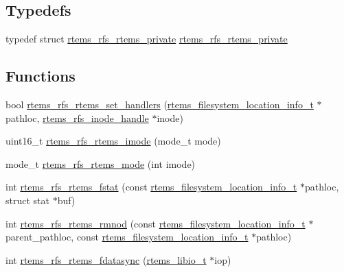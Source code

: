 \subsection*{Typedefs}
\begin{DoxyCompactItemize}
\item 
typedef struct \mbox{\hyperlink{structrtems__rfs__rtems__private}{rtems\+\_\+rfs\+\_\+rtems\+\_\+private}} \mbox{\hyperlink{rtems-rfs-rtems_8h_aceaad4b4b8bccb8901ad1562f83835c8}{rtems\+\_\+rfs\+\_\+rtems\+\_\+private}}
\end{DoxyCompactItemize}
\subsection*{Functions}
\begin{DoxyCompactItemize}
\item 
bool \mbox{\hyperlink{rtems-rfs-rtems_8h_a476a19330258f7b28ef99a4b709681cf}{rtems\+\_\+rfs\+\_\+rtems\+\_\+set\+\_\+handlers}} (\mbox{\hyperlink{group__LibIO_ga3252b3d31ee3c49ffff0b7604a676864}{rtems\+\_\+filesystem\+\_\+location\+\_\+info\+\_\+t}} $\ast$pathloc, \mbox{\hyperlink{rtems-rfs-inode_8h_a91f02dac5a2d91e072d676f3266ab8d2}{rtems\+\_\+rfs\+\_\+inode\+\_\+handle}} $\ast$inode)
\item 
uint16\+\_\+t \mbox{\hyperlink{rtems-rfs-rtems_8h_a1ed03f3bced418219d0c658d8dce5e7a}{rtems\+\_\+rfs\+\_\+rtems\+\_\+imode}} (mode\+\_\+t mode)
\item 
mode\+\_\+t \mbox{\hyperlink{rtems-rfs-rtems_8h_aff5423998d0f78a1caecd4acff199690}{rtems\+\_\+rfs\+\_\+rtems\+\_\+mode}} (int imode)
\item 
int \mbox{\hyperlink{rtems-rfs-rtems_8h_a0ceaa395fe3f5ea0c01383618faa3b5c}{rtems\+\_\+rfs\+\_\+rtems\+\_\+fstat}} (const \mbox{\hyperlink{group__LibIO_ga3252b3d31ee3c49ffff0b7604a676864}{rtems\+\_\+filesystem\+\_\+location\+\_\+info\+\_\+t}} $\ast$pathloc, struct stat $\ast$buf)
\item 
int \mbox{\hyperlink{rtems-rfs-rtems_8h_acb8e7e6615d937f61862719b00445978}{rtems\+\_\+rfs\+\_\+rtems\+\_\+rmnod}} (const \mbox{\hyperlink{group__LibIO_ga3252b3d31ee3c49ffff0b7604a676864}{rtems\+\_\+filesystem\+\_\+location\+\_\+info\+\_\+t}} $\ast$parent\+\_\+pathloc, const \mbox{\hyperlink{group__LibIO_ga3252b3d31ee3c49ffff0b7604a676864}{rtems\+\_\+filesystem\+\_\+location\+\_\+info\+\_\+t}} $\ast$pathloc)
\item 
int \mbox{\hyperlink{rtems-rfs-rtems_8h_afea85d020da25d7bba8b14906c58a74a}{rtems\+\_\+rfs\+\_\+rtems\+\_\+fdatasync}} (\mbox{\hyperlink{structrtems__libio__tt}{rtems\+\_\+libio\+\_\+t}} $\ast$iop)
\end{DoxyCompactItemize}

